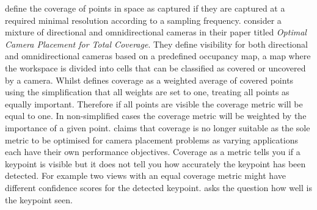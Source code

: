 \citet{horster2006optimal} define the coverage of points in space as captured if they are captured at a required minimal resolution according to a sampling frequency.
\citet{gonzalez2009optimal} consider a mixture of directional and omnidirectional cameras in their paper titled \textit{Optimal Camera Placement for Total Coverage}. They define visibility for both directional and omnidirectional cameras based on a predefined occupancy map, a map where the workspace is divided into cells that can be classified as covered or uncovered by a camera.
Whilst \citet{zhao2013approximate} defines coverage as a weighted average of covered points using the simplification that all weights are set to one, treating all points as equally important. Therefore if all points are visible the coverage metric will be equal to one. In non-simplified cases the coverage metric will be weighted by the importance of a given point.
\citet{zhao2013approximate} claims that coverage is no longer suitable as the sole metric to be optimised for camera placement problems as varying applications each have their own performance objectives.
Coverage as a metric tells you if a keypoint is visible but it does not tell you how accurately the keypoint has been detected. For example two views with an equal coverage metric might have different confidence scores for the detected keypoint.
\citet{olague2002optimal} asks the question how well is the keypoint seen.

